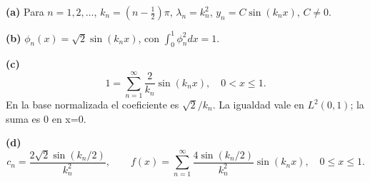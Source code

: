 \noindent\textbf{(a)} Para \(n=1,2,\ldots\), \(k_n=(n-\tfrac12)\pi\),
\(\lambda_n=k_n^2\), \(y_n=C\sin(k_nx)\), \(C\ne0\).

\noindent\textbf{(b)} \(\phi_n(x)=\sqrt2\sin(k_nx)\), con \(\int_0^1\phi_n^2dx=1\).

\noindent\textbf{(c)} \[1=\sum_{n=1}^{\infty}\frac{2}{k_n}\sin(k_nx),\quad0<x\le1.\]
En la base normalizada el coeficiente es \(\sqrt2/k_n\).
La igualdad vale en \(L^2(0,1)\); la suma es 0 en x=0.

\noindent\textbf{(d)} \[c_n=\frac{2\sqrt2\sin(k_n/2)}{k_n^2},\qquad
f(x)=\sum_{n=1}^{\infty}\frac{4\sin(k_n/2)}{k_n^2}\sin(k_nx),\quad0\le x\le1.\]
